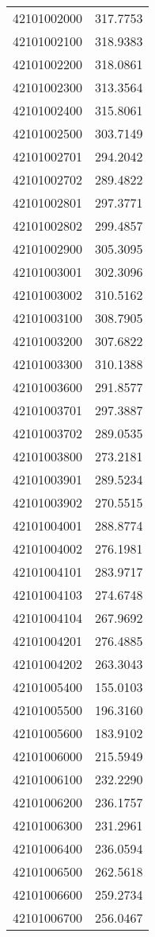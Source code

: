 \begin{longtable}[t]{lr}
42101002000 & 317.7753\\
42101002100 & 318.9383\\
42101002200 & 318.0861\\
42101002300 & 313.3564\\
42101002400 & 315.8061\\
42101002500 & 303.7149\\
42101002701 & 294.2042\\
42101002702 & 289.4822\\
42101002801 & 297.3771\\
42101002802 & 299.4857\\
42101002900 & 305.3095\\
42101003001 & 302.3096\\
42101003002 & 310.5162\\
42101003100 & 308.7905\\
42101003200 & 307.6822\\
42101003300 & 310.1388\\
42101003600 & 291.8577\\
42101003701 & 297.3887\\
42101003702 & 289.0535\\
42101003800 & 273.2181\\
42101003901 & 289.5234\\
42101003902 & 270.5515\\
42101004001 & 288.8774\\
42101004002 & 276.1981\\
42101004101 & 283.9717\\
42101004103 & 274.6748\\
42101004104 & 267.9692\\
42101004201 & 276.4885\\
42101004202 & 263.3043\\
42101005400 & 155.0103\\
42101005500 & 196.3160\\
42101005600 & 183.9102\\
42101006000 & 215.5949\\
42101006100 & 232.2290\\
42101006200 & 236.1757\\
42101006300 & 231.2961\\
42101006400 & 236.0594\\
42101006500 & 262.5618\\
42101006600 & 259.2734\\
42101006700 & 256.0467\\

\end{longtable}
